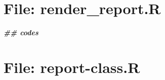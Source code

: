 \documentclass[
]{article}
\newenvironment{Shaded}{\begin{snugshade}}{\end{snugshade}}
\newcommand{\DocumentationTok}[1]{\textcolor[rgb]{0.56,0.35,0.01}{\textbf{\textit{#1}}}}
\begin{document}
\hypertarget{file-render_report.r}{%
\section{File: render\_report.R}\label{file-render_report.r}}

\begin{Shaded}
\begin{Highlighting}[]
\DocumentationTok{\#\# codes}
\end{Highlighting}
\end{Shaded}

\hypertarget{file-report-class.r}{%
\section{File: report-class.R}\label{file-report-class.r}}
\end{document}
